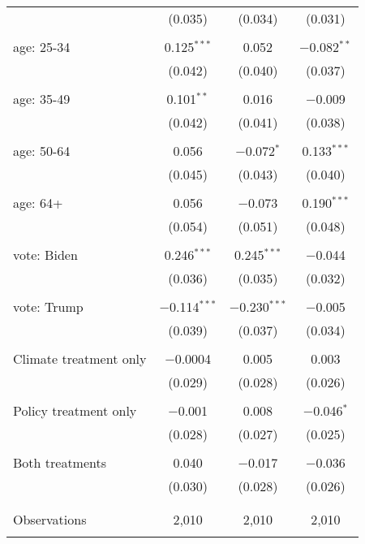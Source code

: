 \begin{tabular}{@{\extracolsep{5pt}}lccc}
  & (0.035) & (0.034) & (0.031) \\ 
  & & & \\ 
 age: 25-34 & 0.125$^{***}$ & 0.052 & $-$0.082$^{**}$ \\ 
  & (0.042) & (0.040) & (0.037) \\ 
  & & & \\ 
 age: 35-49 & 0.101$^{**}$ & 0.016 & $-$0.009 \\ 
  & (0.042) & (0.041) & (0.038) \\ 
  & & & \\ 
 age: 50-64 & 0.056 & $-$0.072$^{*}$ & 0.133$^{***}$ \\ 
  & (0.045) & (0.043) & (0.040) \\ 
  & & & \\ 
 age: 64+ & 0.056 & $-$0.073 & 0.190$^{***}$ \\ 
  & (0.054) & (0.051) & (0.048) \\ 
  & & & \\ 
 vote: Biden & 0.246$^{***}$ & 0.245$^{***}$ & $-$0.044 \\ 
  & (0.036) & (0.035) & (0.032) \\ 
  & & & \\ 
 vote: Trump & $-$0.114$^{***}$ & $-$0.230$^{***}$ & $-$0.005 \\ 
  & (0.039) & (0.037) & (0.034) \\ 
  & & & \\ 
 Climate treatment only & $-$0.0004 & 0.005 & 0.003 \\ 
  & (0.029) & (0.028) & (0.026) \\ 
  & & & \\ 
 Policy treatment only & $-$0.001 & 0.008 & $-$0.046$^{*}$ \\ 
  & (0.028) & (0.027) & (0.025) \\ 
  & & & \\ 
 Both treatments & 0.040 & $-$0.017 & $-$0.036 \\ 
  & (0.030) & (0.028) & (0.026) \\ 
  & & & \\ 
\hline \\[-1.8ex] 

Observations & 2,010 & 2,010 & 2,010 \\ 
\hline 
\hline \\[-1.8ex] 
\end{tabular} 